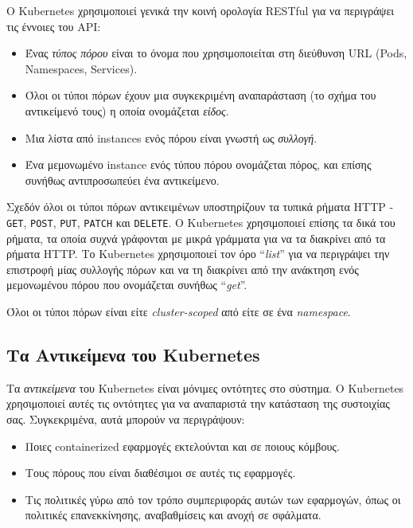 Ο Kubernetes χρησιμοποιεί γενικά την κοινή ορολογία RESTful για να περιγράψει
τις έννοιες του API:
\begin{itemize}
      \tightlist
      \item Ένας \textit{τύπος πόρου} είναι το όνομα που χρησιμοποιείται στη
            διεύθυνση URL (Pods, Namespaces, Services).
      \item Όλοι οι τύποι πόρων έχουν μια συγκεκριμένη αναπαράσταση (το σχήμα
            του αντικείμενό τους) η οποία ονομάζεται \textit{είδος}.
      \item Μια λίστα από instances ενός πόρου είναι γνωστή ως \textit{συλλογή}.
      \item Ένα μεμονωμένο instance ενός τύπου πόρου ονομάζεται πόρος, και
            επίσης συνήθως αντιπροσωπεύει ένα αντικείμενο.
\end{itemize}

Σχεδόν όλοι οι τύποι πόρων αντικειμένων υποστηρίζουν τα τυπικά ρήματα HTTP -
\texttt{GET}, \texttt{POST}, \texttt{PUT}, \texttt{PATCH} και \texttt{DELETE}. Ο
Kubernetes χρησιμοποιεί επίσης τα δικά του ρήματα, τα οποία συχνά γράφονται με
μικρά γράμματα για να τα διακρίνει από τα ρήματα HTTP. Το Kubernetes
χρησιμοποιεί τον όρο ``\textit{list}'' για να περιγράψει την επιστροφή μίας
συλλογής πόρων και να τη διακρίνει από την ανάκτηση ενός μεμονωμένου πόρου που
ονομάζεται συνήθως ``\textit{get}''.

Όλοι οι τύποι πόρων είναι είτε \textit{cluster-scoped} από είτε σε ένα
\textit{namespace}.


\subsection{Τα Αντικείμενα του Kubernetes}

Τα \textit{αντικείμενα} του Kubernetes είναι μόνιμες οντότητες στο σύστημα. Ο
Kubernetes χρησιμοποιεί αυτές τις οντότητες για να αναπαριστά την κατάσταση της
συστοιχίας σας. Συγκεκριμένα, αυτά μπορούν να περιγράψουν:
\begin{itemize}
      \tightlist
      \item Ποιες containerized εφαρμογές εκτελούνται και σε ποιους κόμβους.
      \item Τους πόρους που είναι διαθέσιμοι σε αυτές τις εφαρμογές.
      \item Τις πολιτικές γύρω από τον τρόπο συμπεριφοράς αυτών των εφαρμογών,
            όπως οι πολιτικές επανεκκίνησης, αναβαθμίσεις και ανοχή σε σφάλματα.
\end{itemize}


